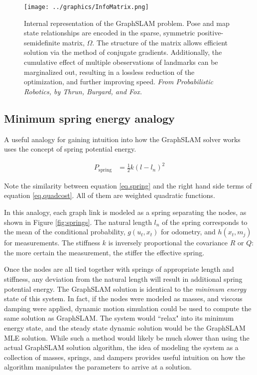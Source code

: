 \begin{figure}[htbp]
   \centering
   \texttt{[image: ../graphics/InfoMatrix.png]} %
   \caption{Internal representation of the GraphSLAM problem. Pose and map state relationships are encoded in the sparse, symmetric positive-semidefinite matrix, $\Omega$. The structure of the matrix allows efficient solution via the method of conjugate gradients. Additionally, the cumulative effect of multiple obeservations of landmarks can be marginalized out, resulting in a lossless reduction of the optimization, and further improving speed. \emph{From Probabilistic Robotics, by Thrun, Burgard, and Fox.}}
   \label{fig:GraphSLAMinternal}
\end{figure}

\subsection{Minimum spring energy analogy}

A useful analogy for gaining intuition into how the GraphSLAM solver works uses the concept of spring potential energy. 

\begin{align}
P_{\text{spring}} &= \frac{1}{2}k\left(l-l_n\right)^2
\label{eq.spring}
\end{align}

Note the similarity between equation \ref{eq.spring} and the right hand side terms of equation \ref{eq.quadcost}. All of them are weighted quadratic functions.

In this analogy, each graph link is modeled as a spring separating the nodes, as shown in Figure \ref{fig:springs}. The natural length $l_n$ of the spring corresponds to the mean of the conditional probability,  $g\left(u_t,x_t\right)$ for odometry, and $h\left(x_t,m_j\right)$ for measurements. The stiffness $k$ is inversely proportional the covariance $R$ or $Q$: the more certain the measurement, the stiffer the effective spring. 

Once the nodes are all tied together with springs of appropriate length and stiffness, any deviation from the natural length will result in additional spring potential energy. The GraphSLAM solution is identical to the \emph{minimum energy} state of this system. In fact, if the nodes were modeled as masses, and viscous damping were applied, dynamic motion simulation could be used to compute the same solution as GraphSLAM. The system would ``relax" into its minimum energy state, and the steady state dynamic solution would be the GraphSLAM MLE solution. While such a method would likely be much slower than using the actual GraphSLAM solution algorithm, the idea of modeling the system as a collection of masses, springs, and dampers provides useful intuition on how the algorithm manipulates the parameters to arrive at a solution.

